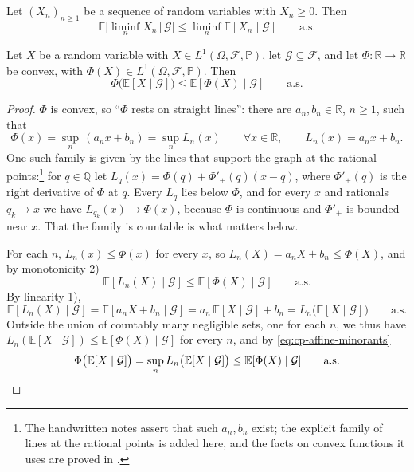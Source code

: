 \begin{lemma}\label{lem:cp-fatou}
Let $(X_n)_{n\ge1}$ be a sequence of random variables with $X_n\ge0$. Then
\[
  \mathbb E\big[\liminf_nX_n\,\big|\,\mathcal G\big]\le\liminf_n\mathbb E[X_n\mid\mathcal G]
  \qquad\text{a.s.}
\]
\end{lemma}

\begin{theorem}\label{thm:cp-jensen}
Let $X$ be a random variable with $X\in L^1(\Omega,\mathcal F,\mathbb P)$, let
$\mathcal G\subseteq\mathcal F$, and let $\Phi:\mathbb R\to\mathbb R$ be convex, with
$\Phi(X)\in L^1(\Omega,\mathcal F,\mathbb P)$. Then
\[
  \Phi\big(\mathbb E[X\mid\mathcal G]\big)\le\mathbb E[\Phi(X)\mid\mathcal G]\qquad\text{a.s.}
\]
\end{theorem}

\begin{proof}
$\Phi$ is convex, so ``$\Phi$ rests on straight lines'': there are $a_n,b_n\in\mathbb R$,
$n\ge1$, such that
\begin{equation}\label{eq:cp-affine-minorants}
  \Phi(x)=\sup_n\,(a_nx+b_n)=\sup_nL_n(x)\qquad\forall x\in\mathbb R,\qquad L_n(x)=a_nx+b_n .
\end{equation}
One such family is given by the lines that support the graph at the rational
points:\footnote{The handwritten notes assert that such $a_n,b_n$ exist; the explicit family
of lines at the rational points is added here, and the facts on convex functions it uses are proved in
.} for $q\in\mathbb Q$ let
$L_q(x)=\Phi(q)+\Phi'_+(q)(x-q)$, where $\Phi'_+(q)$ is the right derivative of $\Phi$ at $q$.
Every $L_q$ lies below $\Phi$, and for every $x$ and rationals $q_k\to x$ we have
$L_{q_k}(x)\to\Phi(x)$, because $\Phi$ is continuous and $\Phi'_+$ is bounded near $x$. That the
family is countable is what matters below.

For each $n$, $L_n(x)\le\Phi(x)$ for every $x$, so $L_n(X)=a_nX+b_n\le\Phi(X)$, and by
monotonicity 2)
\[
  \mathbb E[L_n(X)\mid\mathcal G]\le\mathbb E[\Phi(X)\mid\mathcal G]\qquad\text{a.s.}
\]
By linearity 1),
\[
  \mathbb E[L_n(X)\mid\mathcal G]=\mathbb E[a_nX+b_n\mid\mathcal G]=a_n\,\mathbb E[X\mid\mathcal G]+b_n
  =L_n\big(\mathbb E[X\mid\mathcal G]\big)\qquad\text{a.s.}
\]
Outside the union of countably many negligible sets, one for each $n$, we thus have
$L_n(\mathbb E[X\mid\mathcal G])\le\mathbb E[\Phi(X)\mid\mathcal G]$ for every $n$, and by
\eqref{eq:cp-affine-minorants}
\[
  \Phi\big(\mathbb E[X\mid\mathcal G]\big)=\sup_nL_n\big(\mathbb E[X\mid\mathcal G]\big)
  \le\mathbb E[\Phi(X)\mid\mathcal G]\qquad\text{a.s.}\qedhere
\]
\end{proof}

